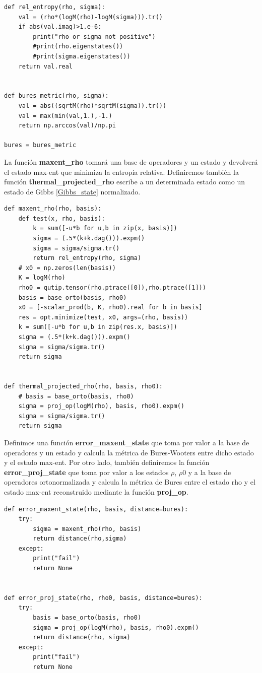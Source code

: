\documentclass{report} %
\numberwithin{equation}{section}
\begin{document}
\begin{verbatim}
def rel_entropy(rho, sigma):
    val = (rho*(logM(rho)-logM(sigma))).tr()
    if abs(val.imag)>1.e-6:
        print("rho or sigma not positive")
        #print(rho.eigenstates())
        #print(sigma.eigenstates())
    return val.real


def bures_metric(rho, sigma):
    val = abs((sqrtM(rho)*sqrtM(sigma)).tr())
    val = max(min(val,1.),-1.)
    return np.arccos(val)/np.pi
        
bures = bures_metric
\end{verbatim}

La función \textbf{maxent_rho} tomará una base de operadores y un estado y devolverá el estado max-ent que minimiza la entropía relativa. Definiremos también la función \textbf{thermal_projected_rho} escribe a un determinada estado como un estado de Gibbs \eqref{Gibbs_state} normalizado.

\begin{verbatim}
def maxent_rho(rho, basis):   
    def test(x, rho, basis):
        k = sum([-u*b for u,b in zip(x, basis)])        
        sigma = (.5*(k+k.dag())).expm()
        sigma = sigma/sigma.tr()
        return rel_entropy(rho, sigma)    
    # x0 = np.zeros(len(basis))
    K = logM(rho)
    rho0 = qutip.tensor(rho.ptrace([0]),rho.ptrace([1]))
    basis = base_orto(basis, rho0)
    x0 = [-scalar_prod(b, K, rho0).real for b in basis]
    res = opt.minimize(test, x0, args=(rho, basis))
    k = sum([-u*b for u,b in zip(res.x, basis)])        
    sigma = (.5*(k+k.dag())).expm()
    sigma = sigma/sigma.tr()
    return sigma
    
    
def thermal_projected_rho(rho, basis, rho0):
    # basis = base_orto(basis, rho0)
    sigma = proj_op(logM(rho), basis, rho0).expm()
    sigma = sigma/sigma.tr()
    return sigma
\end{verbatim}

Definimos una función \textbf{error_maxent_state} que toma por valor a la base de operadores y un estado y calcula la métrica de Bures-Wooters entre dicho estado y el estado max-ent. Por otro lado, también definiremos la función \textbf{error_proj_state} que toma por valor a los estados $\rho$, $\rho0$ y a la base de operadores ortonormalizada y calcula la métrica de Bures entre el estado rho y el estado max-ent reconstruido mediante la función \textbf{proj_op}. 

\begin{verbatim}
def error_maxent_state(rho, basis, distance=bures):
    try:
        sigma = maxent_rho(rho, basis)
        return distance(rho,sigma)
    except:
        print("fail")
        return None
    
    
def error_proj_state(rho, rho0, basis, distance=bures):
    try:
        basis = base_orto(basis, rho0)
        sigma = proj_op(logM(rho), basis, rho0).expm()
        return distance(rho, sigma)
    except:
        print("fail")
        return None
    
\end{verbatim}
\end{document}
